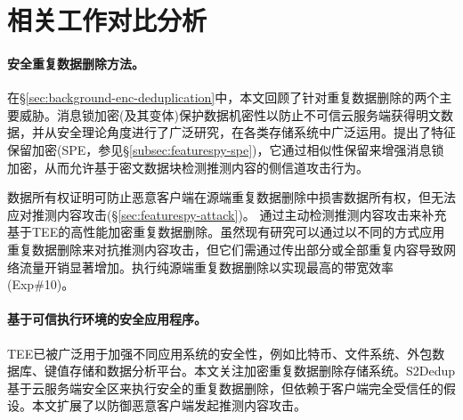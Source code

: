 \section{相关工作对比分析}
\label{sec:featurespy-related-work}

\paragraph*{安全重复数据删除方法。}
在\S\ref{sec:background-enc-deduplication}中，本文回顾了针对重复数据删除的两个主要威胁。消息锁加密(及其变体)保护数据机密性以防止不可信云服务端获得明文数据，并从安全理论角度进行了广泛研究，在各类存储系统中广泛运用。\sysnameF 提出了特征保留加密(SPE，参见\S\ref{subsec:featurespy-spe})，它通过相似性保留来增强消息锁加密，从而允许基于密文数据块检测推测内容的侧信道攻击行为。

数据所有权证明可防止恶意客户端在源端重复数据删除中损害数据所有权，但无法应对推测内容攻击(\S\ref{sec:featurespy-attack})。 \sysnameF 通过主动检测推测内容攻击来补充基于TEE的高性能加密重复数据删除\sysnameS。虽然现有研究可以通过以不同的方式应用重复数据删除来对抗推测内容攻击，但它们需通过传出部分或全部重复内容导致网络流量开销显著增加。\sysnameF 执行纯源端重复数据删除以实现最高的带宽效率(Exp\#10)。

\paragraph*{基于可信执行环境的安全应用程序。}
TEE已被广泛用于加强不同应用系统的安全性，例如比特币、文件系统、外包数据库、键值存储和数据分析平台。本文关注加密重复数据删除存储系统。S2Dedup基于云服务端安全区来执行安全的重复数据删除，但依赖于客户端完全受信任的假设。本文扩展了\sysnameS 以防御恶意客户端发起推测内容攻击。